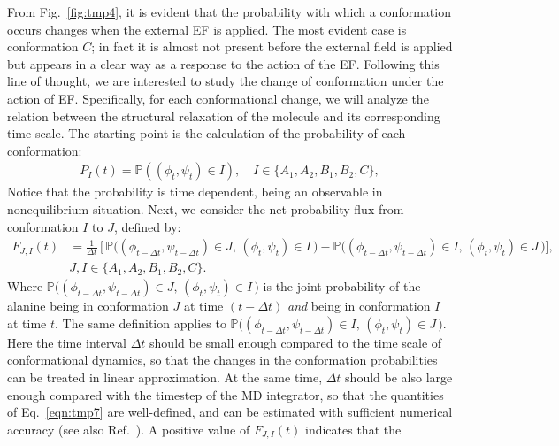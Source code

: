 \documentclass[a4paper,preprint,unsortedaddress,onecolumn]{revtex4-1}
\begin{document}
From Fig.~\ref{fig:tmp4}, it is evident that the probability with which a
conformation occurs changes when the external EF is applied.
The most evident case is conformation $C$; in fact it is {almost} not present before the external field is applied but appears in a clear way as a response to the action of the EF. Following this line of thought, we are interested to study the change of conformation under the action of EF. Specifically, for each conformational change, we will analyze the relation between the structural relaxation of the molecule and its corresponding time scale. 
The starting point is the calculation of the probability
of each conformation:
\begin{align}
  P_I(t) = \mathbb P ( (\phi_t,\psi_t) \in I), \quad  I \in \{A_1, A_2, B_1, B_2, C\},
\end{align}
Notice that the probability is time dependent, being an observable in nonequilibrium situation.
Next,
we consider the net probability flux from conformation $I$ to $J$, defined by:
\begin{align}\nonumber
  F_{J,I}(t) & = \frac1{\Delta t}\,
  \bigg[\,
  \mathbb P \big( (\phi_{t-\Delta t},\psi_{t-\Delta t}) \in J,\, (\phi_t, \psi_t) \in I \,\big) 
  -
  \mathbb P \big( (\phi_{t-\Delta t}, \psi_{t-\Delta t}) \in I,\, (\phi_t, \psi_t) \in J \,\big)
  \bigg], \\\label{eqn:tmp7}
  & J,I \in \{A_1, A_2, B_1, B_2, C\}.
\end{align}
Where $\mathbb P\big( (\phi_{t-\Delta t}, \psi_{t-\Delta t}) \in J,\, (\phi_t, \psi_t) \in I\,\big)$
is the joint probability of the alanine being in conformation $J$ at
time $(t-\Delta t)$ \emph{and} being in conformation $I$ at time $t$.
The same definition applies to
$\mathbb P \big( (\phi_{t-\Delta t}, \psi_{t-\Delta t}) \in I,\, (\phi_t, \psi_t) \in J\,\big)$.
Here the time interval $\Delta t$ should be small enough compared to the
time scale of conformational dynamics,
so that the changes in the conformation probabilities
can be treated in linear approximation.
At the same time,  $\Delta t$ should be also large enough compared with
the timestep of the MD integrator, 
so that the quantities of Eq.~\eqref{eqn:tmp7} are well-defined, and can be
estimated with sufficient numerical accuracy (see also Ref.~\cite{schuette2011markov}).
A positive value of $F_{J,I}(t)$ indicates that the
\end{document}
